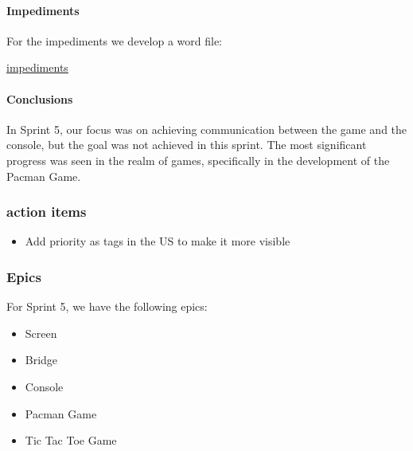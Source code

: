 \paragraph{Impediments}
For the impediments we develop a word file:

\href{https://docs.google.com/spreadsheets/d/1S3ndUFktff6ETyNhOyirIFNed71W4ApTLGyjX8xSzUQ/edit?usp=sharing}{impediments}

\paragraph{Conclusions}

In Sprint 5, our focus was on achieving communication between the game and the console, but the goal was not achieved in this sprint. The most significant progress was seen in the realm of games, specifically in the development of the Pacman Game.

\subsubsection{action items}

\begin{itemize}
    \item Add priority as tags in the US to make it more visible
\end{itemize}


\subsubsection{Epics}

For Sprint 5, we have the following epics:

\begin{itemize}
    \item Screen
    \item Bridge
    \item Console
    \item Pacman Game
    \item Tic Tac Toe Game
\end{itemize}